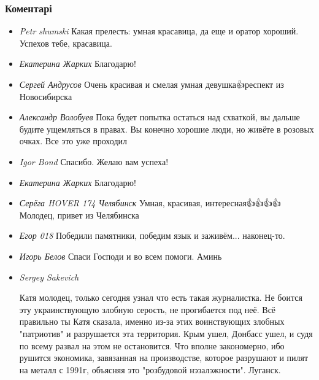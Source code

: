  
 
 
 
 
\subsubsection{Коментарі}
\label{sec:12_04_2021.youtube.zharkih_ekaterina.istoria_post_jazyk.cmt}

\begin{itemize}

\item \emph{Petr shumski}
Какая прелесть: умная красавица, да еще и оратор хороший. Успехов тебе, красавица.

\item \emph{Екатерина Жарких}
Благодарю!

\item \emph{Сергей Андрусов}
Очень красивая и смелая умная девушка👍респект из Новосибирска

\item \emph{Александр Волобуев}
Пока будет попытка остаться над схваткой, вы дальше будите ущемляться в правах.
Вы конечно хорошие люди, но живёте в розовых очках. Все это уже проходил

\item \emph{Igor Bond}
Спасибо. Желаю вам успеха!

\item \emph{Екатерина Жарких}
Благодарю!

\item \emph{Серёга HOVER 174 Челябинск}
Умная, красивая, интересная👍👍👍👍 Молодец, привет из Челябинска

\item \emph{Егор 018}
Победили памятники, победим язык и заживём... наконец-то.

\item \emph{Игорь Белов}
Спаси Господи и во всем помоги. Аминь

\item \emph{Sergey Sakevich}

Катя молодец, только сегодня узнал что есть такая журналистка. Не боится эту
украинствующую злобную серость, не прогибается под неё. Всё правильно ты Катя
сказала, именно из-за этих воинствующих злобных "патриотив" и разрушается эта
территория. Крым ушел, Донбасс  ушел, и судя по всему развал на этом не
остановится. Что вполне закономерно, ибо рушится экономика, завязанная на
производстве, которое разрушают и пилят на металл с 1991г, объясняя это
"розбудовой нэзалэжности". Луганск.


\end{itemize}
